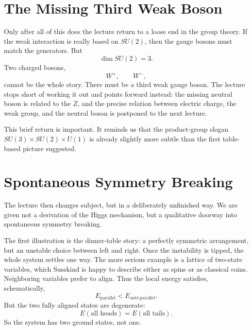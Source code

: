 \section{The Missing Third Weak Boson}

Only after all of this does the lecture return to a loose end in the group theory. If the weak interaction is really based on \(SU(2)\), then the gauge bosons must match the generators. But
\begin{equation}
\dim SU(2)=3.
\end{equation}
Two charged bosons,
\begin{equation}
W^+,\qquad W^-,
\end{equation}
cannot be the whole story. There must be a third weak gauge boson. The lecture stops short of working it out and points forward instead: the missing neutral boson is related to the \(Z\), and the precise relation between electric charge, the weak group, and the neutral boson is postponed to the next lecture.

This brief return is important. It reminds us that the product-group slogan \(SU(3)\times SU(2)\times U(1)\) is already slightly more subtle than the first table-based picture suggested.

\section{Spontaneous Symmetry Breaking}

The lecture then changes subject, but in a deliberately unfinished way. We are given not a derivation of the Higgs mechanism, but a qualitative doorway into spontaneous symmetry breaking.

The first illustration is the dinner-table story: a perfectly symmetric arrangement, but an unstable choice between left and right. Once the instability is tipped, the whole system settles one way. The more serious example is a lattice of two-state variables, which Susskind is happy to describe either as spins or as classical coins. Neighboring variables prefer to align. Thus the local energy satisfies, schematically,
\begin{equation}
E_{\text{parallel}} < E_{\text{anti-parallel}}.
\end{equation}
But the two fully aligned states are degenerate:
\begin{equation}
E(\text{all heads}) = E(\text{all tails}).
\end{equation}
So the system has two ground states, not one.

